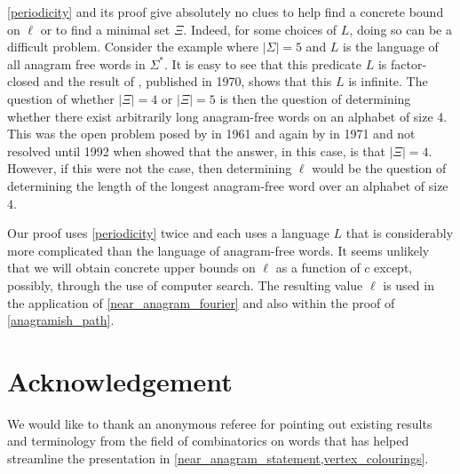\documentclass{patmorin}
\begin{document}
\cref{periodicity} and its proof give absolutely no clues to help find a concrete bound on $\ell$ or to find a minimal set $\Xi$. Indeed, for some choices of $L$, doing so can be a difficult problem.  Consider the example where $|\Sigma|=5$ and $L$ is the language of all anagram free words in $\Sigma^*$. It is easy to see that this predicate $L$ is factor-closed and the result of \citet{pleasants:non-repetitive}, published in 1970, shows that this $L$ is infinite.  The question of whether $|\Xi|=4$ or $|\Xi|=5$ is then the question of determining whether there exist arbitrarily long anagram-free words on an alphabet of size $4$.  This was the open problem posed by \citet{erdos:some} in 1961 and again by \citet{brown:is} in 1971 and not resolved until 1992 when \citet{keranen:abelian,keranen:powerful} showed that the answer, in this case, is that $|\Xi|=4$.  However, if this were not the case, then determining $\ell$ would be the question of determining the length of the longest anagram-free word over an alphabet of size $4$.

Our proof uses \cref{periodicity} twice and each uses a language $L$ that is considerably more complicated than the language of anagram-free words. It seems unlikely that we will obtain concrete upper bounds on $\ell$ as a function of $c$ except, possibly, through the use of computer search. The resulting value $\ell$ is used in the application of \cref{near_anagram_fourier} and also within the proof of \cref{anagramish_path}.

\section*{Acknowledgement}

We would like to thank an anonymous referee for pointing out existing results and terminology from the field of combinatorics on words that has helped streamline the presentation in \cref{near_anagram_statement,vertex_colourings}.



\end{document}
